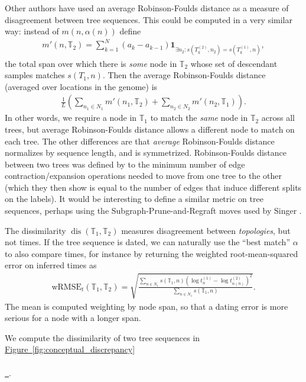\documentclass[10pt,twoside,lineno]{gsajnl}
\newcommand{\T}{\mathbb{T}}
\newcommand{\ind}{\mathbf{1}}
\newcommand{\dis}{\operatorname{dis}}
\newcommand*{\figref}[2][]{%
	\hyperref[{#2}]{%
		Figure~\ref*{#2}%
		\ifx\\#1\\%
		\else
		\,#1%
		\fi
	}%
}
\begin{document}
Other authors \citep[e.g.,]{kelleher2019inferring} have used
an average Robinson-Foulds distance \citep{robinson1981comparison}
as a measure of disagreement between tree sequences.
This could be computed in a very similar way:
instead of $m(n, \alpha(n))$ define
\begin{align*}
    m'(n, \T_2) = \sum_{k=1}^N (a_k - a_{k-1}) \ind_{\exists n_2: s(T^{(2)}_k, n_2) = s(T^{(1)}_k, n)} ,
\end{align*}
the total span over which there is \emph{some} node in $\T_2$ whose set of descendant samples
matches $s(T_1,n)$.
Then the average Robinson-Foulds distance (averaged over locations in the genome)
is
\begin{align*}
    \frac{1}{L} \left( \sum_{n_1 \in N_1} m'(n_1, \T_2)  + \sum_{n_2 \in N_2} m'(n_2, \T_1) \right).
\end{align*}
In other words, we require a node in $\T_1$ to match the \emph{same} node in $\T_2$
across all trees, but average Robinson-Foulds distance allows a different node to match
on each tree.
The other differences are that \emph{average} Robinson-Foulds distance
normalizes by sequence length, and is symmetrized.
Robinson-Foulds distance between two trees
was defined by \citet{robinson1981comparison}
to the minimum number of edge contraction/expansion operations needed to move
from one tree to the other
(which they then show is equal to the number of edges that induce different splits on the labels).
It would be interesting to define a similar metric on tree sequences,
perhaps using the Subgraph-Prune-and-Regraft moves used by Singer \citet{deng2024robust}.

The dissimilarity $\dis(\T_1, \T_2)$ measures disagreement between \emph{topologies},
but not times.
If the tree sequence is dated, we can naturally use the ``best match'' $\alpha$
to also compare times,
for instance by returning the weighted root-mean-squared error on inferred times as
\begin{align*}
    \text{wRMSE}_t(\T_1, \T_2)
    = \sqrt{\frac{
        \sum_{n \in N_1} s(\T_1,n) \left(\log t^{(1)}_n - \log t^{(2)}_{\alpha(n)} \right)^2 
    }{
        \sum_{n \in N_1} s(\T_1,n)
    } } .
\end{align*}
The mean is computed weighting by node span, so that a dating error
is more serious for a node with a longer span. 

We compute the dissimilarity of two tree sequences in \figref{fig:conceptual_discrepancy}.
\end{document}
